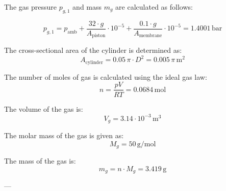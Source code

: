 The gas pressure \( p_{g,1} \) and mass \( m_g \) are calculated as follows:  

\[
p_{g,1} = p_{\text{amb}} + \frac{32 \cdot g}{A_{\text{piston}}} \cdot 10^{-5} + \frac{0.1 \cdot g}{A_{\text{membrane}}} \cdot 10^{-5} = 1.4001 \, \text{bar}
\]

The cross-sectional area of the cylinder is determined as:  
\[
A_{\text{cylinder}} = 0.05 \, \pi \cdot D^2 = 0.005 \, \pi \, \text{m}^2
\]

The number of moles of gas is calculated using the ideal gas law:  
\[
n = \frac{p V}{R T} = 0.0684 \, \text{mol}
\]

The volume of the gas is:  
\[
V_g = 3.14 \cdot 10^{-3} \, \text{m}^3
\]

The molar mass of the gas is given as:  
\[
M_g = 50 \, \text{g/mol}
\]

The mass of the gas is:  
\[
m_g = n \cdot M_g = 3.419 \, \text{g}
\]

---